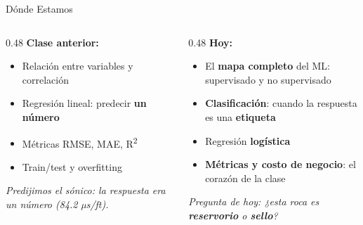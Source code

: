 \documentclass[aspectratio=169, 11pt]{beamer}
\begin{document}
\begin{frame}{Dónde Estamos}
  \vspace{-6pt}
  \begin{columns}[T]
    \begin{column}{0.48\textwidth}
      {\small\color{arcaDark}\bfseries\faCheckCircle\hspace{5pt}Clase anterior:}
      \vspace{4pt}
      {\footnotesize\color{textMuted}
      \begin{itemize}\setlength{\itemsep}{3pt}
        \item[{\color{codeGreen}\scriptsize\faCheck}]
          Relación entre variables y correlación
        \item[{\color{codeGreen}\scriptsize\faCheck}]
          Regresión lineal: predecir \textbf{un número}
        \item[{\color{codeGreen}\scriptsize\faCheck}]
          Métricas RMSE, MAE, R\textsuperscript{2}
        \item[{\color{codeGreen}\scriptsize\faCheck}]
          Train/test y overfitting
      \end{itemize}
      }
      \vspace{8pt}
      {\scriptsize\color{textMuted}\itshape
        Predijimos el sónico: la respuesta era
        un número (84.2 µs/ft).}
    \end{column}
    \begin{column}{0.48\textwidth}
      {\small\color{arcaDark}\bfseries\faForward\hspace{5pt}Hoy:}
      \vspace{4pt}
      {\footnotesize\color{textMuted}
      \begin{itemize}\setlength{\itemsep}{3pt}
        \item[{\color{arcaRed}\scriptsize\faArrowRight}]
          El \textbf{mapa completo} del ML: supervisado y no supervisado
        \item[{\color{arcaRed}\scriptsize\faArrowRight}]
          \textbf{Clasificación}: cuando la respuesta es una \textbf{etiqueta}
        \item[{\color{arcaRed}\scriptsize\faArrowRight}]
          Regresión \textbf{logística}
        \item[{\color{arcaRed}\scriptsize\faStar}]
          \textbf{Métricas y costo de negocio}: el corazón de la clase
      \end{itemize}
      }
      \vspace{6pt}
      {\scriptsize\color{arcaDark}\itshape
        Pregunta de hoy: ¿esta roca es \textbf{reservorio} o \textbf{sello}?}
    \end{column}
  \end{columns}
\end{frame}
\end{document}
